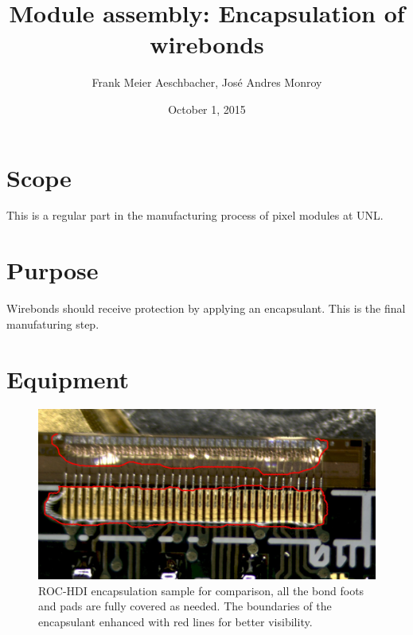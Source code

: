 \documentclass[12pt]{unlsilabsop}
\title{Module assembly: Encapsulation of wirebonds}
\date{October 1, 2015}
\author{Frank Meier Aeschbacher, José Andres Monroy}
\begin{document}
\maketitle

\section{Scope}
This is a regular part in the manufacturing process of pixel modules at UNL.

\section{Purpose}
Wirebonds should receive protection by applying an encapsulant. This is the final manufaturing step.



\section{Equipment}

\begin{figure}[ht]
  \begin{center}
    \includegraphics[width=\textwidth]{img/potting_reference.jpg}
    \caption{ROC-HDI encapsulation sample for comparison, all the bond foots and pads are fully covered as needed. The boundaries of the encapsulant enhanced with red lines for better visibility.}
    \label{fig:potting_reference}
  \end{center}
\end{figure}
\end{document}
